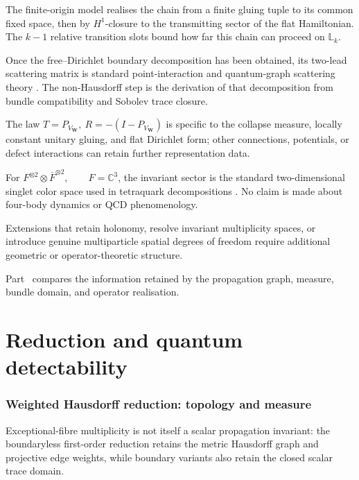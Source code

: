 \documentclass[11pt]{article}
\theoremstyle{plain}
\theoremstyle{definition}
\newcommand{\C}{\mathbb{C}}
\begin{document}
The finite-origin model realises the chain from a finite gluing tuple to its common fixed space, then by \(H^1\)-closure to the transmitting sector of the flat Hamiltonian. The \(k-1\) relative transition slots bound how far this chain can proceed on \(\mathbb L_k\).

Once the free--Dirichlet boundary decomposition has been obtained, its two-lead scattering matrix is standard point-interaction and quantum-graph scattering theory
\citep{KostrykinSchrader99,BerkolaikoKuchment2013,AlbeverioEtAl05}.
The non-Hausdorff step is the derivation of that decomposition from bundle compatibility and Sobolev trace closure.

The law \(T=P_{V_{\mathbf W}},\ R=-(I-P_{V_{\mathbf W}})\) is specific to the collapse measure, locally constant unitary gluing, and flat Dirichlet form; other connections, potentials, or defect interactions can retain further representation data.

For
\(F^{\otimes2}\otimes\overline F^{\otimes2}, \qquad F=\C^3\),
the invariant sector is the standard two-dimensional singlet color space used in tetraquark decompositions
\citep{Slansky1981,ParkLee2014}. No claim is made about four-body dynamics or QCD phenomenology.

Extensions that retain holonomy, resolve invariant multiplicity spaces, or introduce genuine multiparticle spatial degrees of freedom require additional geometric or operator-theoretic structure.


Part~\ref{part:detectability} compares the information retained by the propagation graph, measure, bundle domain, and operator realisation.

\clearpage
\part{Reduction and quantum detectability}
\label{part:detectability}

\section{Weighted Hausdorff reduction: topology and measure}
\label{sec:topology-versus-channels}
\label{sec:weighted-hausdorff-reduction}
\label{sec:measure-dependence}

Exceptional-fibre multiplicity is not itself a scalar propagation invariant: the boundaryless first-order reduction retains the metric Hausdorff graph and projective edge weights, while boundary variants also retain the closed scalar trace domain.
\end{document}
